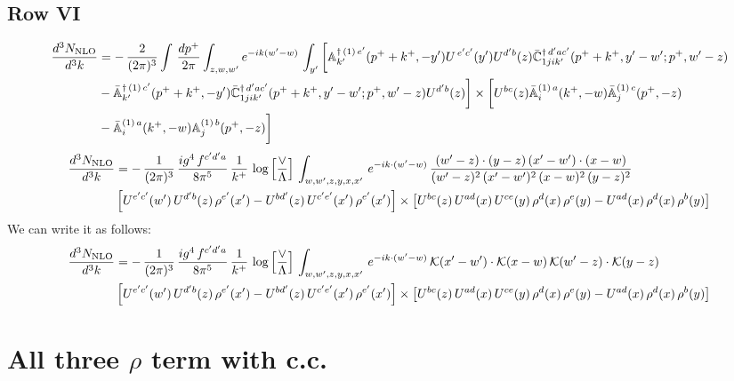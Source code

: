 \documentclass[9pt]{article}
\def\mf#1{\mathbb{#1}}
\numberwithin{equation}{section}
\begin{document}
\subsection{Row VI}
\begin{align}
     \frac{d^{3}N_{\rm NLO}}{d^{3}k} & =   -\,\frac{2}{(2\pi)^{3}} \int\, \frac{dp^{+}}{2\pi}\int_{z,w,w^{\prime}} e^{-ik(w^{\prime}-w)}\, \int_{y^{\prime}}\bigg[\mf{A}^{\dagger\, (1)\,e^{\prime}}_{k^{\prime}}(p^{+}+k^{+},-y^{\prime})U^{\, e^{\prime}c^{\prime}}(y^{\prime})U^{d^{\prime}b}(z) \Bar{\mf{C}}^{\dagger\, d^{\prime}ac^{\prime}}_{1jik^{\prime}}(p^{+}+k^{+},y^{\prime}-w^{\prime}; p^{+},w^{\prime}-z) \notag \\ & -\Bar{\mf{A}}^{\dagger\, (1)\,c^{\prime}}_{k^{\prime}}(p^{+}+k^{+},-y^{\prime})\Bar{\mf{C}}^{\dagger\, d^{\prime}ac^{\prime}}_{1jik^{\prime}}(p^{+}+k^{+},y^{\prime}-w^{\prime}; p^{+},w^{\prime}-z)U^{d^{\prime}b}(z)\bigg] \times \bigg[U^{bc}(z)\Bar{\mf{A}}^{(1)\, a}_{i}(k^{+},- w)\Bar{\mf{A}}^{(1)\, c}_{j}(p^{+},-z)\notag \\ & -\Bar{\mf{A}}^{(1)\, a}_{i}(k^{+},- w) \mf{A}^{(1)\, b}_{j}(p^{+},- z)\bigg]\nonumber
\end{align}
\begin{align}
    \frac{d^{3}N_{\rm NLO}}{d^{3}k} & = -\,\frac{1}{(2\pi)^{3}}\, \frac{ig^{4}\,f^{c'd'a}}{8\pi^{5}}\, \frac{1}{k^{+}}\,\log{\left[\frac{\vee}{\Lambda}\right]}\, \int_{w,w',z,y,x,x'}\, e^{-ik\cdot (w'-w)}\,\frac{(w'-z)\cdot (y-z)\,(x'-w')\cdot (x-w)}{(w'-z)^{2}\,(x'-w')^{2}\,(x-w)^{2}\,(y-z)^{2}}\notag \\ & \left[U^{e'c'}(w')\,U^{d'b}(z)\,\rho^{e'}(x')-U^{bd'}(z)\,U^{c'e'}(x')\,\rho^{e'}(x')\right]\times  \left[U^{bc}(z)\,U^{ad}(x)\,U^{ce}(y)\,\rho^{d}(x)\,\rho^{e}(y)-U^{ad}(x)\,\rho^{d}(x)\,\rho^{b}(y)\right]
\end{align}
We can write it as follows:
\begin{align}
    \frac{d^{3}N_{\rm NLO}}{d^{3}k} & = -\,\frac{1}{(2\pi)^{3}}\, \frac{ig^{4}\,f^{c'd'a}}{8\pi^{5}}\, \frac{1}{k^{+}}\,\log{\left[\frac{\vee}{\Lambda}\right]}\, \int_{w,w',z,y,x,x'}\, e^{-ik\cdot (w'-w)}\,\mathcal{K}(x'-w')\cdot \mathcal{K}(x-w)\,\mathcal{K}(w'-z)\cdot \mathcal{K}(y-z)\notag \\ & \left[U^{e'c'}(w')\,U^{d'b}(z)\,\rho^{e'}(x')-U^{bd'}(z)\,U^{c'e'}(x')\,\rho^{e'}(x')\right]\times  \left[U^{bc}(z)\,U^{ad}(x)\,U^{ce}(y)\,\rho^{d}(x)\,\rho^{e}(y)-U^{ad}(x)\,\rho^{d}(x)\,\rho^{b}(y)\right]
\end{align}
\section{All three $\rho$ term with c.c.}
\end{document}
